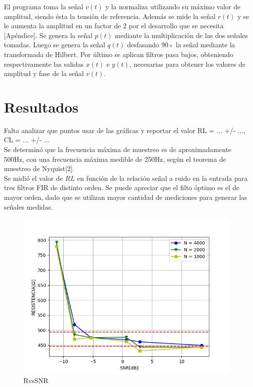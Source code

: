 \documentclass[11pt,a4paper]{extarticle}
\begin{document}
\begin{multicols}{2}
El programa toma la señal $v(t)$
y la normaliza utilizando su máximo valor de amplitud,
 siendo ésta la tensión de referencia. Además se mide 
 la señal $r(t)$ y se le aumenta la amplitud en un factor
 de 2 por el desarrollo que se necesita [Apéndice].
Se genera la señal $p(t)$ mediante la multiplicación de 
las dos señales tomadas.
Luego se genera la señal $q(t)$ desfasando 90◦
la señal 
mediante la transformada de Hilbert.
Por último se aplican filtros pasa bajos,
 obteniendo respectivamente las salidas $x(t)$ e $y(t)$,
  necesarias para obtener los
valores de amplitud y fase de la señal $v(t)$.


\section{Resultados}

Falta analizar que puntos usar de las gráficas y reportar
el valor RL = ... +/- ..., CL = ... +/- ...\\

Se determinó que la frecuencia máxima de muestreo es 
de aproximadamente 
500Hz, con una frecuencia máxima medible de 250Hz, 
según el teorema de muestreo de Nyquist[2].\\

Se midió el valor de $RL$ en función 
de la relación señal a ruido en la entrada para tres 
filtros FIR de distinto orden.
Se puede apreciar que el filto óptimo es el de mayor 
orden, dado que se utilizan mayor cantidad de 
mediciones para generar las señales medidas.

\begin{figure}[H]
	\centering
	\includegraphics[width=\linewidth]{Images/RvsSNR(segunda).png}
	\caption{RvsSNR}
	\label{fig:RvsSNR}
\end{figure}


\end{multicols}
\end{document}
